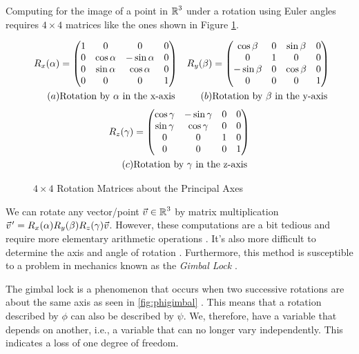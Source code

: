  Computing for the image of a point in $\operatorname{\mathbb{R}}^3$ under a rotation using Euler angles requires $4\times 4$ matrices like the ones shown in Figure \ref{4x4}. 
\begin{figure}[h]
	\begin{align*}
			{R}_{x}{(\alpha)} &=
			\begin{pmatrix}
				1 & 0 & 0 & 0 \\
				0 & \cos{\alpha} & -\sin{\alpha} & 0 \\
				0 & \sin{\alpha} & \cos{\alpha} & 0 \\
				0 & 0 & 0 & 1
			\end{pmatrix}
			&
			{R}_{y}{(\beta)} &=
			\begin{pmatrix}
				\cos{\beta} & 0 & \sin{\beta} & 0 \\
				0 & 1 & 0 & 0 \\
				-\sin{\beta} & 0 & \cos{\beta} & 0 \\
				0 & 0 & 0 & 1
			\end{pmatrix} \\
			(a) & \text{Rotation by $\alpha$ in the x-axis} 
			& 
			(b) & \text{Rotation by $\beta$ in the y-axis}	
	 \end{align*} 
		 \begin{align*}
			{R}_{z}{(\gamma)} &=
			\begin{pmatrix}
				\cos{\gamma} & -\sin{\gamma} & 0 & 0 \\
				\sin{\gamma} & \cos{\gamma} &  0 & 0 \\
				0 & 0 & 1 & 0 \\
				0 & 0 & 0 & 1
		 \end{pmatrix} \\
		 (c) & \text{Rotation by $\gamma$ in the z-axis}	
		\end{align*}
		\caption{$4\times 4$ Rotation Matrices about the Principal Axes}
		\label{4x4}
\end{figure}

We can rotate any vector/point $\vec{v} \in \operatorname{\mathbb{R}}^3$ by matrix multiplication $\pvec{v}' = \Rx{R}{x}{\alpha}\Rx{R}{y}{\beta}\Rx{R}{z}{\gamma}\vec{v}$. However, these computations are a bit tedious and require more elementary arithmetic operations \cite{lerios}. It's also more difficult to determine the axis and angle of rotation \cite{lerios}. Furthermore, this method is susceptible to a problem in mechanics known as the \emph{Gimbal Lock} \cite{jia}.

The gimbal lock is a phenomenon that occurs when two successive rotations are about the same axis as seen in \ref{fig:phigimbal} \cite{goldstein}. This means that a rotation described by $\phi$ can also be described by $\psi$. We, therefore, have a variable that depends on another, i.e., a variable that can no longer vary independently. This indicates a loss of one degree of freedom. 

